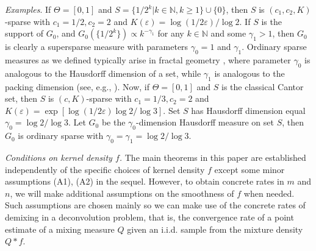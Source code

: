 \documentclass[MSNbibl,number,citesort]{arxbj}
\newcommand{\Nat}{\mathbb{N}}
\newcommand{\real}{\mathbb{R}}
\begin{document}
\textit{Examples}.
If $\Theta= [0,1]$ and $S = \{1/2^k| k \in\Nat, k\geq1\} \cup\{0\}$,
then $S$ is $(c_1,c_2,K)$-sparse with $c_1=1/2, c_2= 2$ and
$K(\varepsilon) = \log(1/2\varepsilon)/\log2$. If $S$ is the
support of
$G_0$, and $G_0(\{1/2^k\}) \propto k^{-\gamma_1}$ for any $k\in\Nat$
and some $\gamma_1 > 1$,
then $G_0$ is clearly a supersparse measure with parameters $\gamma_0
= 1$
and $\gamma_1$. Ordinary sparse measures as we defined typically arise
in fractal geometry \cite{Falconer}, where parameter $\gamma_0$ is
analogous to
the Hausdorff dimension of a set, while $\gamma_1$ is analogous to the packing
dimension (see, e.g., \cite{Garcia-etal-07}). Now,
if $\Theta= [0,1]$ and $S$ is the classical Cantor set,
then $S$ is $(c,K)$-sparse with $c_1=1/3, c_2 = 2$
and $K(\varepsilon) = \exp[\log(1/2\varepsilon)\log2/\log3]$.
Set $S$ has Hausdorff dimension equal $\gamma_0 = \log2/\log3$.
Let $G_0$ be the $\gamma_0$-dimension Hausdorff measure on set $S$,
then $G_0$ is ordinary sparse with $\gamma_0 = \gamma_1 = \log2/\log3$.

\textit{Conditions on kernel density $f$.}
The main theorems in this paper are established independently
of the specific choices of kernel density $f$ except
some minor assumptions (A1), (A2) in the sequel.
%
However, to obtain concrete rates in $m$ and $n$,
we will make additional assumptions on the smoothness of $f$ when needed.
Such assumptions are chosen mainly
so we can make use of the concrete rates of demixing in a deconvolution
problem, that is, the convergence rate of a point estimate of a mixing
measure $Q$
given an i.i.d. sample from the mixture density $Q*f$.
\end{document}
